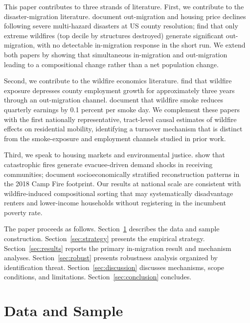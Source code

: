 \documentclass[12pt]{article}
\begin{document}
This paper contributes to three strands of literature.
First, we contribute to the disaster-migration literature.
\citet{boustan2020effect} document out-migration and housing price declines
following severe multi-hazard disasters at US county resolution;
\citet{mcconnell2024wildfire} find that only extreme wildfires
(top decile by structures destroyed) generate significant out-migration,
with no detectable in-migration response in the short run.
We extend both papers by showing
that simultaneous in-migration and out-migration leading to a compositional change
rather than a net population change.

Second, we contribute to the wildfire economics literature.
\citet{coulombe2025fires} find that wildfire exposure depresses county
employment growth for approximately three years through an out-migration
channel. \citet{borgschulte2024air} document that wildfire smoke reduces quarterly
earnings by 0.1 percent per smoke day. We complement these papers with the first nationally representative,
tract-level causal estimates of wildfire effects on residential mobility,
identifying a turnover mechanism that is distinct from the smoke-exposure
and employment channels studied in prior work.

Third, we speak to housing markets and environmental justice.
\citet{hennighausen2024catastrophic} show that catastrophic fires
generate evacuee-driven demand shocks in receiving communities;
\citet{mcconnell2024post} document socioeconomically stratified
reconstruction patterns in the 2018 Camp Fire footprint.
Our results at national scale are consistent with wildfire-induced
compositional sorting that may systematically disadvantage renters
and lower-income households without registering in the incumbent
poverty rate. 

The paper proceeds as follows.
Section~\ref{sec:data} describes the data and sample construction.
Section~\ref{sec:strategy} presents the empirical strategy.
Section~\ref{sec:results} reports the primary in-migration result
and mechanism analyses.
Section~\ref{sec:robust} presents robustness analysis organized by
identification threat.
Section~\ref{sec:discussion} discusses mechanisms, scope conditions,
and limitations.
Section~\ref{sec:conclusion} concludes.


\section{Data and Sample}
\label{sec:data}
\end{document}
